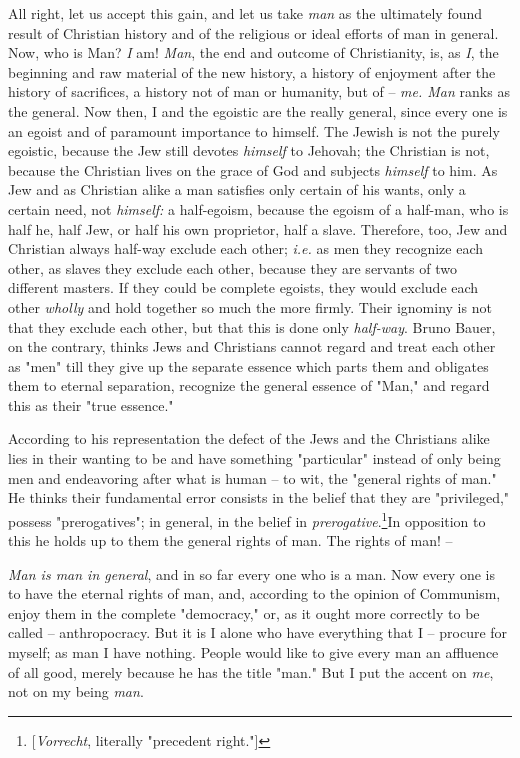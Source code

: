 All right, let us accept this gain, and let us take \textit{man} as the 
ultimately found result of Christian history and of the religious or ideal 
efforts of man in general. Now, who is Man? \textit{I} am! \textit{Man}, the 
end and outcome of Christianity, is, as \textit{I}, the beginning and raw 
material of the new history, a history of enjoyment after the history of 
sacrifices, a history not of man or humanity, but of -- \textit{me. Man} ranks 
as the general. Now then, I and the egoistic are the really general, since 
every one is an egoist and of paramount importance to himself. The Jewish is 
not the purely egoistic, because the Jew still devotes \textit{himself} to 
Jehovah; the Christian is not, because the Christian lives on the grace of God 
and subjects \textit{himself} to him. As Jew and as Christian alike a man 
satisfies only certain of his wants, only a certain need, not 
\textit{himself:} a half-egoism, because the egoism of a half-man, who is half 
he, half Jew, or half his own proprietor, half a slave. Therefore, too, Jew 
and Christian always half-way exclude each other; \textit{i.e.} as men they 
recognize each other, as slaves they exclude each other, because they are 
servants of two different masters. If they could be complete egoists, they 
would exclude each other \textit{wholly} and hold together so much the more 
firmly. Their ignominy is not that they exclude each other, but that this is 
done only \textit{half-way}. Bruno Bauer, on the contrary, thinks Jews and 
Christians cannot regard and treat each other as "{}men"{} till they give up 
the separate essence which parts them and obligates them to eternal 
separation, recognize the general essence of "{}Man,"{} and regard this as 
their "{}true essence."{}

According to his representation the defect of the Jews and the Christians 
alike lies in their wanting to be and have something "{}particular"{} instead 
of only being men and endeavoring after what is human -- to wit, the 
"{}general rights of man."{} He thinks their fundamental error consists in the 
belief that they are "{}privileged,"{} possess "{}prerogatives"{}; in general, 
in the belief in \textit{prerogative}.\footnote{[\textit{Vorrecht}, literally 
"{}precedent right."{}] }In opposition to this he holds up to them the general 
rights of man. The rights of man! --

\textit{Man is man in general}, and in so far every one who is a man. Now 
every one is to have the eternal rights of man, and, according to the opinion 
of Communism, enjoy them in the complete "{}democracy,"{} or, as it ought more 
correctly to be called -- anthropocracy. But it is I alone who have everything 
that I -- procure for myself; as man I have nothing. People would like to give 
every man an affluence of all good, merely because he has the title "{}man."{} 
But I put the accent on \textit{me}, not on my being \textit{man}.


